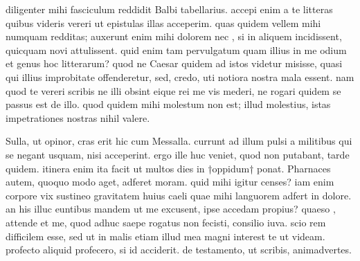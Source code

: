 


 diligenter mihi fasciculum reddidit Balbi tabellarius. accepi enim a te litteras quibus videris vereri ut epistulas illas acceperim. quas quidem vellem mihi numquam redditas; auxerunt enim mihi dolorem nec , si in aliquem incidissent, quicquam novi attulissent. quid enim tam pervulgatum quam illius in me odium et genus hoc litterarum? quod ne Caesar quidem ad istos videtur misisse, quasi qui illius improbitate offenderetur, sed, credo, uti notiora nostra mala essent. nam quod te vereri scribis ne illi obsint eique rei me vis mederi, ne rogari quidem se passus est de illo. quod quidem mihi molestum non est; illud molestius, istas impetrationes nostras nihil valere.

 Sulla, ut opinor, cras erit hic cum Messalla. currunt ad illum pulsi a militibus qui se negant usquam, nisi acceperint. ergo ille huc veniet, quod non putabant, tarde quidem. itinera enim ita facit ut multos dies in †oppidum† ponat. Pharnaces autem, quoquo modo aget, adferet moram. quid mihi igitur censes? iam enim corpore vix sustineo gravitatem huius caeli quae mihi languorem adfert in dolore. an his illuc euntibus mandem ut me excusent, ipse accedam propius? quaeso , attende et me, quod adhuc saepe rogatus non fecisti, consilio iuva. scio rem difficilem esse, sed ut in malis etiam illud mea magni interest te ut videam. profecto aliquid profecero, si id acciderit. de testamento, ut scribis, animadvertes.
